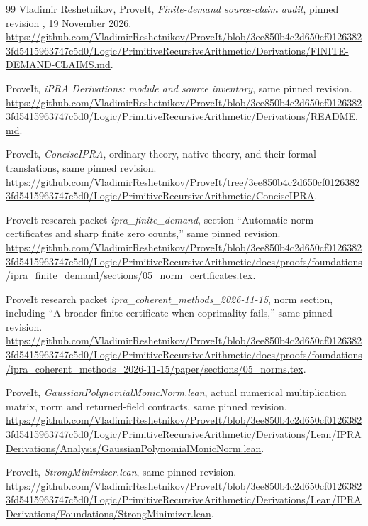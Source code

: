 \begin{thebibliography}{99}
\small
{}
Vladimir Reshetnikov, ProveIt, \emph{Finite-demand source-claim audit}, pinned revision \texttt{\pin}, 19 November 2026.
\url{https://github.com/VladimirReshetnikov/ProveIt/blob/3ee850b4c2d650cf01263823fd5415963747c5d0/Logic/PrimitiveRecursiveArithmetic/Derivations/FINITE-DEMAND-CLAIMS.md}.

ProveIt, \emph{iPRA Derivations: module and source inventory}, same pinned revision.
\url{https://github.com/VladimirReshetnikov/ProveIt/blob/3ee850b4c2d650cf01263823fd5415963747c5d0/Logic/PrimitiveRecursiveArithmetic/Derivations/README.md}.

ProveIt, \emph{ConciseIPRA}, ordinary theory, native theory, and their formal translations, same pinned revision.
\url{https://github.com/VladimirReshetnikov/ProveIt/tree/3ee850b4c2d650cf01263823fd5415963747c5d0/Logic/PrimitiveRecursiveArithmetic/ConciseIPRA}.

ProveIt research packet \emph{ipra\_finite\_demand}, section ``Automatic norm certificates and sharp finite zero counts,'' same pinned revision.
\url{https://github.com/VladimirReshetnikov/ProveIt/blob/3ee850b4c2d650cf01263823fd5415963747c5d0/Logic/PrimitiveRecursiveArithmetic/docs/proofs/foundations/ipra_finite_demand/sections/05_norm_certificates.tex}.

ProveIt research packet \emph{ipra\_coherent\_methods\_2026-11-15}, norm section, including ``A broader finite certificate when coprimality fails,'' same pinned revision.
\url{https://github.com/VladimirReshetnikov/ProveIt/blob/3ee850b4c2d650cf01263823fd5415963747c5d0/Logic/PrimitiveRecursiveArithmetic/docs/proofs/foundations/ipra_coherent_methods_2026-11-15/paper/sections/05_norms.tex}.

ProveIt, \emph{GaussianPolynomialMonicNorm.lean}, actual numerical multiplication matrix, norm and returned-field contracts, same pinned revision.
\url{https://github.com/VladimirReshetnikov/ProveIt/blob/3ee850b4c2d650cf01263823fd5415963747c5d0/Logic/PrimitiveRecursiveArithmetic/Derivations/Lean/IPRADerivations/Analysis/GaussianPolynomialMonicNorm.lean}.

ProveIt, \emph{StrongMinimizer.lean}, same pinned revision.
\url{https://github.com/VladimirReshetnikov/ProveIt/blob/3ee850b4c2d650cf01263823fd5415963747c5d0/Logic/PrimitiveRecursiveArithmetic/Derivations/Lean/IPRADerivations/Foundations/StrongMinimizer.lean}.


\end{thebibliography}
